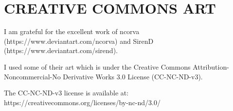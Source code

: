 \onecolumn
\chapter{CREATIVE COMMONS ART}


\noindent I am grateful for the excellent work of ncorva (https://www.deviantart.com/ncorva) and SirenD\\(https://www.deviantart.com/sirend).

\vspace{1em}

\noindent I used some of their art which is under the Creative Commons Attribution-Noncommercial-No Derivative Works 3.0 License (CC-NC-ND-v3).

\vspace{1em}

\noindent The CC-NC-ND-v3 license is available at: https://creativecommons.org/licenses/by-nc-nd/3.0/
